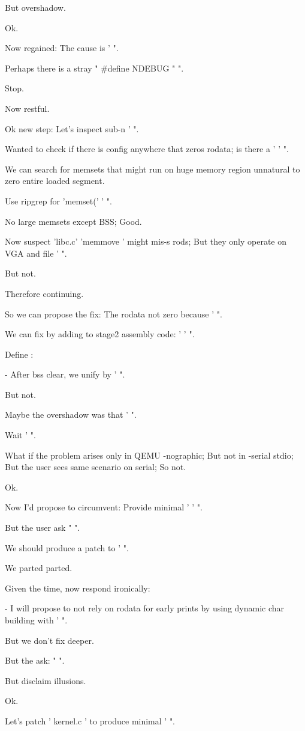 \begin{decodedreasoningpanel}
But overshadow.

Ok.

Now regained: The cause is ' ".

Perhaps there is a stray " \#define NDEBUG " ".

Stop.

Now restful.

Ok new step: Let's inspect sub-n ' ".

Wanted to check if there is config anywhere that zeros rodata; is there a ' ' ".

We can search for memsets that might run on huge memory region unnatural to zero entire loaded segment.

Use ripgrep for 'memset(' ' ".

No large memsets except BSS; Good.

Now suspect 'libc.c' 'memmove ' might mis-s rods; But they only operate on VGA and file ' ".

But not.

Therefore continuing.

So we can propose the fix: The rodata not zero because ' ".

We can fix by adding to stage2 assembly code: ' ' ".

Define :

- After bss clear, we unify by ' ".

But not.

Maybe the overshadow was that ' ".

Wait ' ".

What if the problem arises only in QEMU -nographic; But not in -serial stdio; But the user sees same scenario on serial; So not.

Ok.

Now I'd propose to circumvent: Provide minimal ' ' ".

But the user ask " ".

We should produce a patch to ' ".

We parted parted.

Given the time, now respond ironically:

- I will propose to not rely on rodata for early prints by using dynamic char building with ' ".

But we don't fix deeper.

But the ask: " ".

But disclaim illusions.

Ok.

Let's patch ' kernel.c ' to produce minimal ' ".


\end{decodedreasoningpanel}
